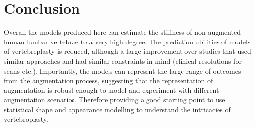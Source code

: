 \section{Conclusion}

Overall the models produced here can estimate the stiffness of non-augmented
human lumbar vertebrae to a very high degree. The prediction abilities of
models of vertebroplasty is reduced, although a large improvement over studies
that used similar approaches and had similar constraints in mind (clinical
resolutions for scans etc.). Importantly, the models can represent the large
range of outcomes from the augmentation process, suggesting that the
representation of augmentation is robust enough to model and experiment with
different augmentation scenarios. Therefore providing a good starting point to
use statistical shape and appearance modelling to understand the intricacies of
vertebroplasty.





